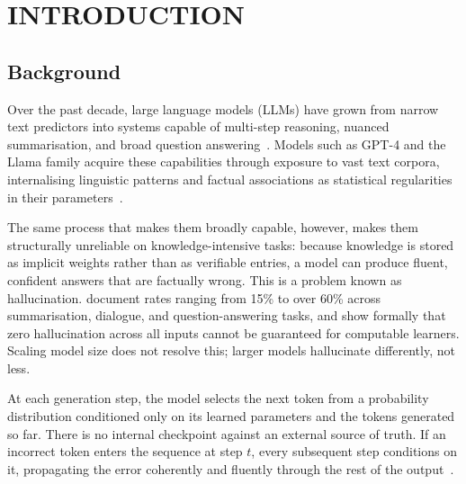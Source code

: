 
\chapter{INTRODUCTION}

\ifpdf
  \graphicspath{{introduction/figures/PNG}{introduction/figures/PDF}{introduction/figures}}
\else
  \graphicspath{{introduction/figures/EPS}{introduction/figures}}
\fi

\section{Background}

Over the past decade, large language models (LLMs) have grown from narrow text predictors into systems capable of multi-step reasoning, nuanced summarisation, and broad question answering~\citep{brown2020gpt3,openai2024gpt4technicalreport}. Models such as GPT-4 and the Llama family acquire these capabilities through exposure to vast text corpora, internalising linguistic patterns and factual associations as statistical regularities in their parameters~\citep{touvron2023llama,dubey2024llama}.

The same process that makes them broadly capable, however, makes them structurally unreliable on knowledge-intensive tasks: because knowledge is stored as implicit weights rather than as verifiable entries, a model can produce fluent, confident answers that are factually wrong. This is a problem known as hallucination. \citet{ji2023survey} document rates ranging from 15\% to over 60\% across summarisation, dialogue, and question-answering tasks, and \citet{xu2025hallucinationinevitableinnatelimitation} show formally that zero hallucination across all inputs cannot be guaranteed for computable learners. Scaling model size does not resolve this; larger models hallucinate differently, not less.

At each generation step, the model selects the next token from a probability distribution conditioned only on its learned parameters and the tokens generated so far. There is no internal checkpoint against an external source of truth. If an incorrect token enters the sequence at step $t$, every subsequent step conditions on it, propagating the error coherently and fluently through the rest of the output~\citep{huang2023survey,ji2023survey}.

